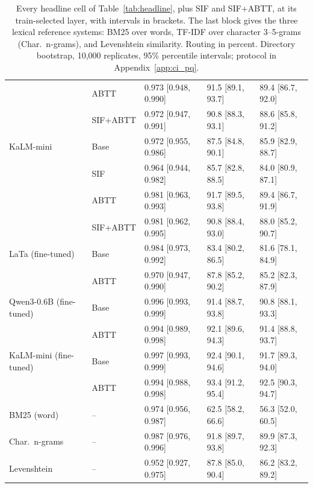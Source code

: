 \begin{table}[t]
\begin{tabular}{lllll}
 & ABTT & 0.973 [0.948, 0.990] & 91.5 [89.1, 93.7] & 89.4 [86.7, 92.0] \\
 & SIF+ABTT & 0.972 [0.947, 0.991] & 90.8 [88.3, 93.1] & 88.6 [85.8, 91.2] \\
\addlinespace
KaLM-mini & Base & 0.972 [0.955, 0.986] & 87.5 [84.8, 90.1] & 85.9 [82.9, 88.7] \\
 & SIF & 0.964 [0.944, 0.982] & 85.7 [82.8, 88.5] & 84.0 [80.9, 87.1] \\
 & ABTT & 0.981 [0.963, 0.993] & 91.7 [89.5, 93.8] & 89.4 [86.7, 91.9] \\
 & SIF+ABTT & 0.981 [0.962, 0.995] & 90.8 [88.4, 93.0] & 88.0 [85.2, 90.7] \\
\midrule
LaTa (fine-tuned) & Base & 0.984 [0.973, 0.992] & 83.4 [80.2, 86.5] & 81.6 [78.1, 84.9] \\
 & ABTT & 0.970 [0.947, 0.990] & 87.8 [85.2, 90.2] & 85.2 [82.3, 87.9] \\
Qwen3-0.6B (fine-tuned) & Base & 0.996 [0.993, 0.999] & 91.4 [88.7, 93.8] & 90.8 [88.1, 93.3] \\
 & ABTT & 0.994 [0.989, 0.998] & 92.1 [89.6, 94.3] & 91.4 [88.8, 93.7] \\
KaLM-mini (fine-tuned) & Base & 0.997 [0.993, 0.999] & 92.4 [90.1, 94.6] & 91.7 [89.3, 94.0] \\
 & ABTT & 0.994 [0.988, 0.998] & 93.4 [91.2, 95.4] & 92.5 [90.3, 94.7] \\
\midrule
BM25 (word) & -- & 0.974 [0.956, 0.987] & 62.5 [58.2, 66.6] & 56.3 [52.0, 60.5] \\
Char.\ n-grams & -- & 0.987 [0.976, 0.996] & 91.8 [89.7, 93.8] & 89.9 [87.3, 92.3] \\
Levenshtein & -- & 0.952 [0.927, 0.975] & 87.8 [85.0, 90.4] & 86.2 [83.2, 89.2] \\
\bottomrule
\end{tabular}
\caption{Every headline cell of Table~\ref{tab:headline}, plus SIF and SIF+ABTT, at its train-selected layer, with intervals in brackets. The last block gives the three lexical reference systems: BM25 over words, TF-IDF over character 3--5-grams (Char.\ n-grams), and Levenshtein similarity. Routing in percent. Directory bootstrap, 10{,}000 replicates, 95\% percentile intervals; protocol in Appendix~\ref{app:ci_pq}.}
\label{tab:headline_ci}
\end{table}
